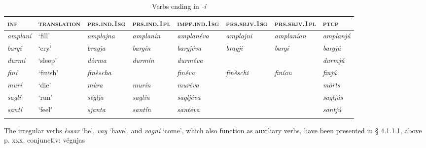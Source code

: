 \begin{sidewaystable} 
	\caption{Verbs ending in \textit{-í}}
	\label{}
	\begin{tabularx}{\textwidth}{llllllll} 
		\lsptoprule
		\textsc{\textbf{inf}} & \textsc{\textbf{translation}} & \textsc{\textbf{prs.ind.1sg}} & \textsc{\textbf{prs.ind.1pl}} & \textsc{\textbf{impf.ind.1sg}} & \textsc{\textbf{prs.sbjv.1sg}} & \textsc{\textbf{prs.sbjv.1pl}} & \textsc{\textbf{ptcp}}\\
		\midrule
		\textit{amplaní} & `fill' & \textit{amplajna} & \textit{amplanín} & \textit{amplanéva} & \textit{amplajni} & \textit{amplanían} & \textit{amplanjú}\\
		\textit{bargí} & `cry' & \textit{bragja}  & \textit{bargín} & \textit{bargjéva} & \textit{bragji} & \textit{bargí} & \textit{bargjú}\\
		\textit{durmí} & `sleep' & \textit{dòrma} & \textit{durmín} & \textit{durméva} & & & \textit{durmjú}\\
		\textit{finí} & `finish' & \textit{finèscha} & & \textit{finéva} & \textit{finèschi} & \textit{finían} & \textit{finjú}\\
		\textit{murí} & `die' & \textit{mùra} & \textit{murín} & \textit{muréva} & & & \textit{mòrts}\\
		\textit{saglí} & `run' & \textit{séglja} & \textit{saglín} & \textit{sagljéva} & & & \textit{sagljús}\\
		\textit{santí} & `feel' & \textit{sjanta} & \textit{santín} & \textit{santéva} & & & \textit{santjú}\\
				\lspbottomrule
	\end{tabularx} 
\end{sidewaystable}



The irregular verbs \textit{èssar} `be', \textit{vay} `have', and \textit{vagní} `come',  which also function as auxiliary verbs, have been presented in § 4.1.1.1, above p. xxx. conjunctiv: végnjas




